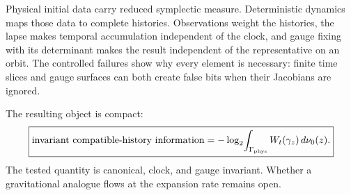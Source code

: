 \documentclass[10pt]{article}
\begin{document}
Physical initial data carry reduced symplectic measure.  Deterministic dynamics
maps those data to complete histories.  Observations weight the histories, the
lapse makes temporal accumulation independent of the clock, and gauge fixing
with its determinant makes the result independent of the representative on an
orbit.  The controlled failures show why every element is necessary: finite
time slices and gauge surfaces can both create false bits when their Jacobians
are ignored.

The resulting object is compact:
\begin{equation}
\boxed{
\text{invariant compatible-history information}
=-\log_2\!\int_{\Gamma_{\rm phys}}
W_t(\gamma_z)\,d\nu_0(z).}
\label{eq:final-object}
\end{equation}
The tested quantity is canonical, clock, and gauge invariant.  Whether a
gravitational analogue flows at the expansion rate remains open.



\end{document}
